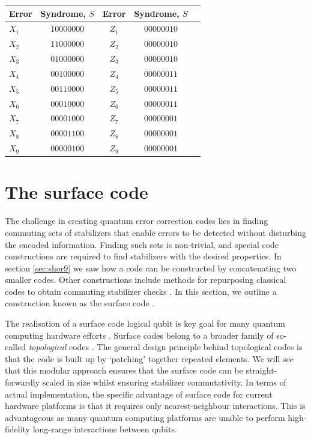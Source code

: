 \documentclass[]{arxiv}
\theoremstyle{plain}%
\theoremstyle{definition}
\theoremstyle{remark}
\begin{document}
\begin{table}
	\def\arraystretch{1.3}
	{\begin{tabular}{lc|ccc} \toprule
			
			Error & Syndrome, $S$ & Error & Syndrome, $S$\\\midrule
			$X_1$ & $10000000$ & $Z_1$ & $00000010$\\
			$X_2$ & $11000000$ & $Z_2$ & $00000010$\\
			$X_3$ & $01000000$ & $Z_3$ & $00000010$\\
			$X_4$ & $00100000$ & $Z_4$ & $00000011$\\
			$X_5$ & $00110000$ & $Z_5$ & $00000011$\\
			$X_6$ & $00010000$ & $Z_6$ & $00000011$\\
			$X_7$ & $00001000$ & $Z_7$ & $00000001$\\
			$X_8$ & $00001100$ & $Z_8$ & $00000001$\\
			$X_9$ & $00000100$ & $Z_9$ & $00000001$\\			
			\bottomrule
	\end{tabular}}
	\label{tab:9qubit}
\end{table}


\section{The surface code}\label{sec:surface}

The challenge in creating quantum error correction codes lies in finding commuting sets of stabilizers that enable errors to be detected without disturbing the encoded information. Finding such sets is non-trivial, and special code constructions are required to find stabilizers with the desired properties. In section \ref{sec:shor9} we saw how a code can be constructed by concatenating two smaller codes. Other constructions include methods for repurposing classical codes to obtain commuting stabilizer checks \cite{Calderbank95,Steane96b,Kovalev13,Tillich14}. In this section, we outline a construction known as the surface code \cite{Bravyi98,Freedman98}.

The realisation of a surface code logical qubit is key goal for many quantum computing hardware efforts \cite{Nickerson14,Kelly16,Rigetti16,OGorman16,Takita17}. Surface codes belong to a broader family of so-called \textit{topological} codes \cite{Kitaev03}. The general design principle behind topological codes is that the code is built up by `patching' together repeated elements. We will see that this modular approach ensures that the surface code can be straight-forwardly scaled in size whilst ensuring stabilizer commutativity. In terms of actual implementation, the specific advantage of surface code for current hardware platforms is that it requires only nearest-neighbour interactions. This is advantageous as many quantum computing platforms are unable to perform high-fidelity long-range interactions between qubits. 
\end{document}
